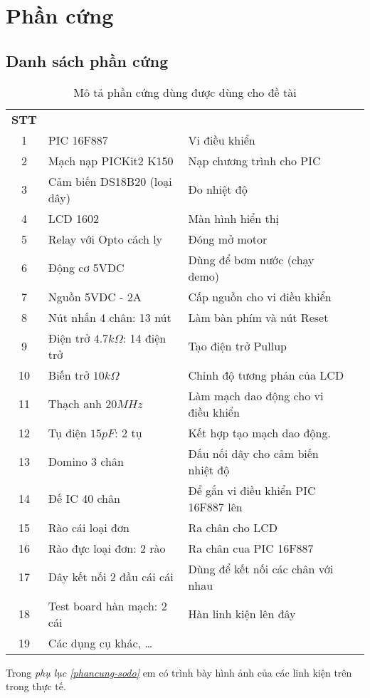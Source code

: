 \chapter{Phần cứng}
\section{Danh sách phần cứng}
\begin{table}[!h]
\begin{center}
\begin{tabular}{|c|p{6cm}|p{7.5cm}|l}\cline{1-3}
\textbf{STT} & \centering{\textbf{Phần cứng}} & \centering{\textbf{Mô tả}} & \\ \cline{1-3}
1 & PIC 16F887 & Vi điều khiển & \\ \cline{1-3}
2 & Mạch nạp PICKit2 K150 & Nạp chương trình cho PIC & \\ \cline{1-3}
3 & Cảm biến DS18B20 (loại dây) & Đo nhiệt độ  & \\ \cline{1-3}
4 & LCD 1602 & Màn hình hiển thị   & \\ \cline{1-3}
5 & Relay với Opto cách ly & Đóng mở motor & \\ \cline{1-3}
6 & Động cơ 5VDC & Dùng để bơm nước (chạy demo)  & \\ \cline{1-3}
7 & Nguồn 5VDC - 2A & Cấp nguồn cho vi điều khiển & \\ \cline{1-3}
8 & Nút nhấn 4 chân: 13 nút & Làm bàn phím và nút Reset  & \\ \cline{1-3}
9 & Điện trở $4.7k\Omega$: 14 điện trở & Tạo điện trở Pullup  & \\ \cline{1-3}
10 & Biến trở $10k\Omega$ & Chỉnh độ tương phản của LCD  & \\ \cline{1-3}
11 & Thạch anh $20MHz$ & Làm mạch dao động cho vi điều khiển  & \\ \cline{1-3}
12 & Tụ điện $15pF$: 2 tụ & Kết hợp tạo mạch dao động. & \\ \cline{1-3}
13 & Domino 3 chân & Đấu nối dây cho cảm biến nhiệt độ  & \\ \cline{1-3}
14 & Đế IC 40 chân & Để gắn vi điều khiển PIC 16F887 lên  & \\ \cline{1-3}
15 & Rào cái loại đơn & Ra chân cho LCD  & \\ \cline{1-3}
16 & Rào đực loại đơn: 2 rào & Ra chân cua PIC 16F887  & \\ \cline{1-3}
17 & Dây kết nối 2 đầu cái cái & Dùng để kết nối các chân với nhau  & \\ \cline{1-3}
18 & Test board hàn mạch: 2 cái & Hàn linh kiện lên đây  & \\ \cline{1-3}
19 & Các dụng cụ khác, \ldots &  & \\ \cline{1-3}
\end{tabular}
\end{center}
\caption{Mô tả phần cứng dùng được dùng cho đề tài}
\end{table}
Trong \textit{phụ lục \ref{phancung-sodo}} em có trình bày hình ảnh của các linh kiện trên trong thực tế.
\newpage
